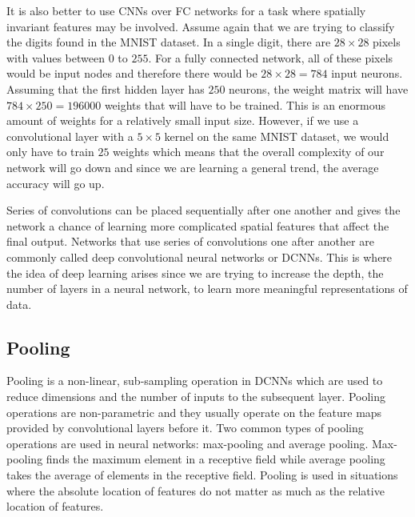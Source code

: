 It is also better to use CNNs over FC networks for a task where spatially invariant features may be involved. Assume again that we are trying to classify the digits found in the MNIST dataset. In a single digit, there are $28 \times 28$ pixels with values between $0$ to $255$. For a fully connected network, all of these pixels would be input nodes and therefore there would be $28 \times 28 = 784$ input neurons. Assuming that the first hidden layer has $250$ neurons, the weight matrix will have $784 \times 250 = 196000$ weights that will have to be trained. This is an enormous amount of weights for a relatively small input size. However, if we use a convolutional layer with a $5 \times 5$ kernel on the same MNIST dataset, we would only have to train $25$ weights which means that the overall complexity of our network will go down and since we are learning a general trend, the average accuracy will go up. 

Series of convolutions can be placed sequentially after one another and gives the network a chance of learning more complicated spatial features that affect the final output. Networks that use series of convolutions one after another are commonly called deep convolutional neural networks or DCNNs. This is where the idea of deep learning arises since we are trying to increase the depth, the number of layers in a neural network, to learn more meaningful representations of data. 


\subsection{Pooling}
Pooling is a non-linear, sub-sampling operation in DCNNs which are used to reduce dimensions and the number of inputs to the subsequent layer. Pooling operations are non-parametric and they usually operate on the feature maps provided by convolutional layers before it. Two common types of pooling operations are used in neural networks: max-pooling and average pooling. Max-pooling \cite{scherer2010evaluation} finds the maximum element in a receptive field while average pooling takes the average of elements in the receptive field. Pooling is used in situations where the absolute location of features do not matter as much as the relative location of features.

